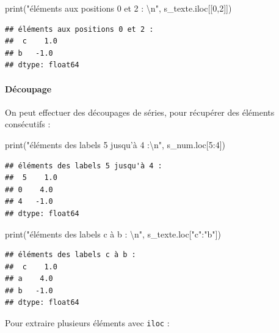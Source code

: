 \documentclass[12pt,]{book}
\newenvironment{Shaded}{\begin{snugshade}}{\end{snugshade}}
\newcommand{\DecValTok}[1]{\textcolor[rgb]{0.00,0.00,0.81}{#1}}
\newcommand{\CharTok}[1]{\textcolor[rgb]{0.31,0.60,0.02}{#1}}
\newcommand{\StringTok}[1]{\textcolor[rgb]{0.31,0.60,0.02}{#1}}
\newcommand{\BuiltInTok}[1]{#1}
\newcommand{\NormalTok}[1]{#1}
\let\oldparagraph\paragraph
\renewcommand{\paragraph}[1]{\oldparagraph{#1}\mbox{}}
\numberwithin{equation}{section}
\numberwithin{countremarque}{section}
\begin{document}
\begin{Shaded}
\begin{Highlighting}[]
\BuiltInTok{print}\NormalTok{(}\StringTok{"éléments aux positions 0 et 2 : }\CharTok{\textbackslash{}n}\StringTok{"}\NormalTok{, s_texte.iloc[[}\DecValTok{0}\NormalTok{,}\DecValTok{2}\NormalTok{]])}
\end{Highlighting}
\end{Shaded}

\begin{lstlisting}
## éléments aux positions 0 et 2 : 
##  c    1.0
## b   -1.0
## dtype: float64
\end{lstlisting}

\paragraph{Découpage}\label{decoupage-series}

On peut effectuer des découpages de séries, pour récupérer des éléments
consécutifs :

\begin{Shaded}
\begin{Highlighting}[]
\BuiltInTok{print}\NormalTok{(}\StringTok{"éléments des labels 5 jusqu'à 4 :}\CharTok{\textbackslash{}n}\StringTok{"}\NormalTok{, s_num.loc[}\DecValTok{5}\NormalTok{:}\DecValTok{4}\NormalTok{])}
\end{Highlighting}
\end{Shaded}

\begin{lstlisting}
## éléments des labels 5 jusqu'à 4 :
##  5    1.0
## 0    4.0
## 4   -1.0
## dtype: float64
\end{lstlisting}

\begin{Shaded}
\begin{Highlighting}[]
\BuiltInTok{print}\NormalTok{(}\StringTok{"éléments des labels c à b : }\CharTok{\textbackslash{}n}\StringTok{"}\NormalTok{, s_texte.loc[}\StringTok{"c"}\NormalTok{:}\StringTok{"b"}\NormalTok{])}
\end{Highlighting}
\end{Shaded}

\begin{lstlisting}
## éléments des labels c à b : 
##  c    1.0
## a    4.0
## b   -1.0
## dtype: float64
\end{lstlisting}

Pour extraire plusieurs éléments avec \texttt{iloc} :
\end{document}

